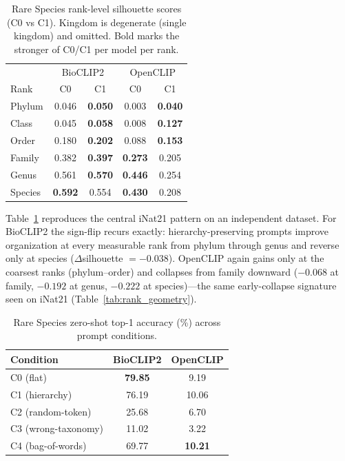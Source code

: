 \begin{table}[t]
\centering
\caption{Rare Species rank-level silhouette scores (C0 vs C1). Kingdom is degenerate
(single kingdom) and omitted. Bold marks the stronger of C0/C1 per model per rank.}
\label{tab:rare_rank}
\begin{tabular}{lcccc}
\hline
 & \multicolumn{2}{c}{BioCLIP2} & \multicolumn{2}{c}{OpenCLIP} \\
Rank & C0 & C1 & C0 & C1 \\
\hline
Phylum  & 0.046 & \textbf{0.050} & 0.003 & \textbf{0.040} \\
Class   & 0.045 & \textbf{0.058} & 0.008 & \textbf{0.127} \\
Order   & 0.180 & \textbf{0.202} & 0.088 & \textbf{0.153} \\
Family  & 0.382 & \textbf{0.397} & \textbf{0.273} & 0.205 \\
Genus   & 0.561 & \textbf{0.570} & \textbf{0.446} & 0.254 \\
Species & \textbf{0.592} & 0.554 & \textbf{0.430} & 0.208 \\
\hline
\end{tabular}
\end{table}

Table~\ref{tab:rare_rank} reproduces the central iNat21 pattern on an independent
dataset. For BioCLIP2 the sign-flip recurs exactly: hierarchy-preserving prompts
improve organization at every measurable rank from phylum through genus and reverse
only at species ($\Delta$silhouette $=-0.038$). OpenCLIP again gains only at the
coarsest ranks (phylum--order) and collapses from family downward ($-0.068$ at
family, $-0.192$ at genus, $-0.222$ at species)---the same early-collapse signature
seen on iNat21 (Table~\ref{tab:rank_geometry}).

\begin{table}[t]
\centering
\caption{Rare Species zero-shot top-1 accuracy (\%) across prompt conditions.}
\label{tab:rare_acc}
\begin{tabular}{lcc}
\hline
Condition & BioCLIP2 & OpenCLIP \\
\hline
C0 (flat)             & \textbf{79.85} & 9.19 \\
C1 (hierarchy)        & 76.19 & 10.06 \\
C2 (random-token)     & 25.68 & 6.70 \\
C3 (wrong-taxonomy)   & 11.02 & 3.22 \\
C4 (bag-of-words)     & 69.77 & \textbf{10.21} \\
\hline
\end{tabular}
\end{table}

